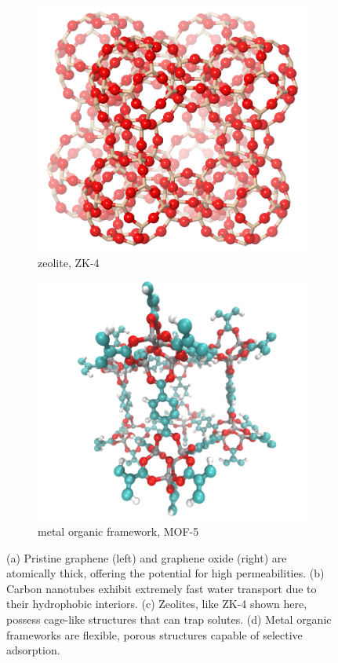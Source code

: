 \begin{figure}
  \begin{subfigure}{0.45\textwidth} %
  \includegraphics[width=\textwidth]{figs/zeolite.png}
  \caption{zeolite, ZK-4}\label{fig:zeolite}
  \end{subfigure}
  \begin{subfigure}{0.45\textwidth}
  \includegraphics[width=\textwidth]{figs/mof.png}
  \caption{metal organic framework, MOF-5}\label{fig:mof}
  \end{subfigure}
  \caption{(a) Pristine graphene (left) and graphene oxide (right) are atomically thick,
  offering the potential for high permeabilities. (b) Carbon nanotubes exhibit extremely
  fast water transport due to their hydrophobic interiors. (c) Zeolites, like ZK-4 
  shown here, possess cage-like structures that can trap solutes. (d) Metal organic
  frameworks are flexible, porous structures capable of selective adsorption. }\label{fig:nanostructured_materials}
  \end{figure}

